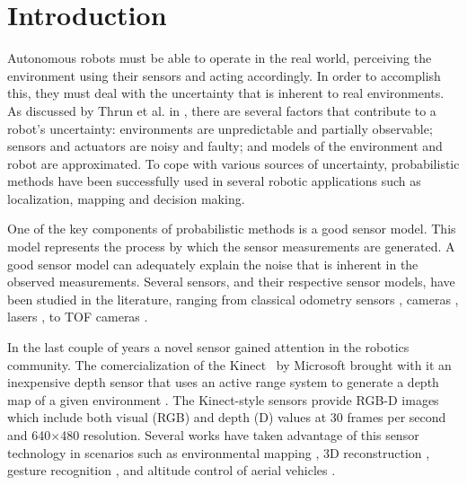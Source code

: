 \section{Introduction} \label{sec:introduction} 


Autonomous robots must be able to operate in the real world, perceiving the
environment using their sensors and acting accordingly. In order to accomplish
this, they must deal with the uncertainty that is inherent to real
environments. As discussed by Thrun et al. in \cite{Thrun:2005:PR:1121596},
there are several factors that contribute to a robot's uncertainty:
environments are unpredictable and partially observable; sensors and actuators
are noisy and faulty; and models of the environment and robot are approximated.
To cope with various sources of uncertainty, probabilistic methods have been successfully
used in several robotic applications such as localization, mapping and decision
making.

One of the key components of probabilistic methods is a good sensor model. This model represents the process by which the sensor measurements are generated. A good sensor model can adequately explain the noise that is inherent in the observed measurements. Several sensors, and their respective sensor models, have been studied in the literature, ranging from classical odometry sensors \cite{Borenstein95}, cameras \cite{Wu07}\cite{clemente2007mapping}, lasers \cite{newman2009navigating}, to \ac{TOF} cameras \cite{may2009three}. 

In the last couple of years a novel sensor gained attention in the robotics
community. The comercialization of the Kinect\texttrademark ~ by Microsoft
brought with it an inexpensive depth sensor that uses an active range system
to generate a depth map of a given environment \cite{Freedman2008}. The Kinect-style
sensors provide RGB-D images which include both visual
(RGB) and depth (D) values at 30 frames per second
and 640$\times$480 resolution. Several works have taken advantage of this
sensor technology in scenarios such as environmental mapping \cite{henry2012rgb}, 3D
reconstruction \cite{Newcombe2011}, gesture recognition \cite{Xia2011}, and altitude control of aerial vehicles \cite{Stowers2011}.


